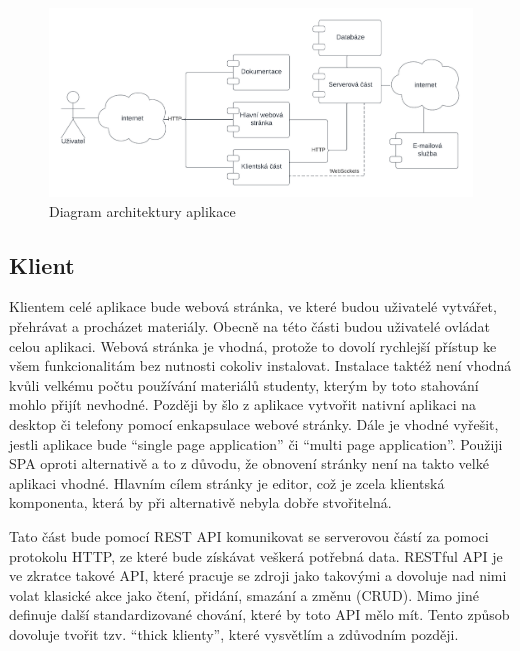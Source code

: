 \begin{figure}[ht!]
    \centering
    \includegraphics[width=1\textwidth]{media/04_navrh/architektura.pdf}
    \caption{Diagram architektury aplikace}\label{fig:architektura}
\end{figure}
 
\subsection{Klient}\label{text:navrh/klient}

Klientem celé aplikace bude webová stránka, ve které budou uživatelé vytvářet, přehrávat a procházet materiály. 
Obecně na této části budou uživatelé ovládat celou aplikaci.
Webová stránka je vhodná, protože to dovolí rychlejší přístup ke všem funkcionalitám bez nutnosti cokoliv instalovat.
Instalace taktéž není vhodná kvůli velkému počtu používání materiálů studenty, kterým by toto stahování mohlo přijít nevhodné.
Později by šlo z aplikace vytvořit nativní aplikaci na desktop či telefony pomocí enkapsulace webové stránky.
Dále je vhodné vyřešit, jestli aplikace bude \enquote{single page application} či \enquote{multi page application}.
Použiji SPA oproti alternativě a to z důvodu, že obnovení stránky není na takto velké aplikaci vhodné.
Hlavním cílem stránky je editor, což je zcela klientská komponenta, která by při alternativě nebyla dobře stvořitelná.  

Tato část bude pomocí REST API komunikovat se serverovou částí za pomoci protokolu HTTP, ze které bude získávat veškerá potřebná data.
RESTful API je ve zkratce takové API, které pracuje se zdroji jako takovými a dovoluje nad nimi volat klasické akce jako čtení, přidání, smazání a změnu (CRUD).
Mimo jiné definuje další standardizované chování, které by toto API mělo mít.
Tento způsob dovoluje tvořit tzv. \enquote{thick klienty}, které vysvětlím a zdůvodním později.

